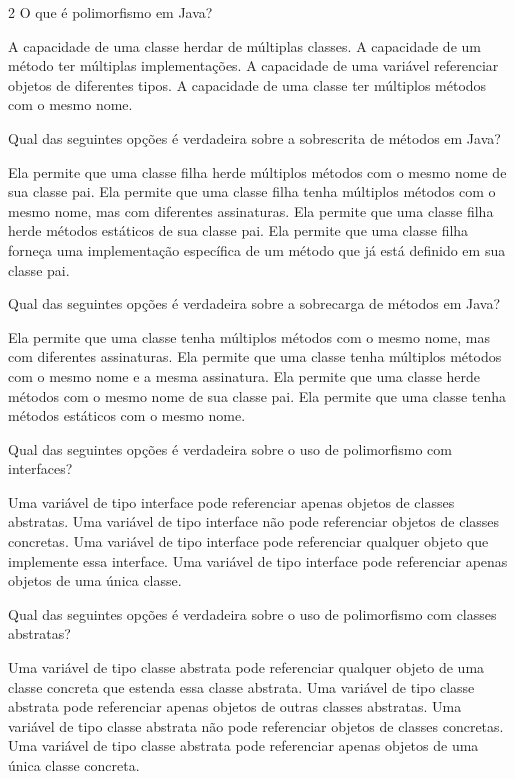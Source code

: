 \documentclass{exam}
\newcounter{solcount}
\newcommand\CC{%
    \CorrectChoice\label{sol:\arabic{solcount}}
    \stepcounter{solcount}
}
\begin{document}
\begin{questions}
\begin{multicols}{2}
\question[1] O que é polimorfismo em Java?
\begin{choices}
 \choice A capacidade de uma classe herdar de múltiplas classes.
 \choice A capacidade de um método ter múltiplas implementações.
 \CC A capacidade de uma variável referenciar objetos de diferentes tipos.
 \choice A capacidade de uma classe ter múltiplos métodos com o mesmo nome.
\end{choices}

\question[1] Qual das seguintes opções é verdadeira sobre a sobrescrita de métodos em Java?
\begin{choices}
 \choice Ela permite que uma classe filha herde múltiplos métodos com o mesmo nome de sua classe pai.
 \choice Ela permite que uma classe filha tenha múltiplos métodos com o mesmo nome, mas com diferentes assinaturas.
 \choice Ela permite que uma classe filha herde métodos estáticos de sua classe pai.
 \CC Ela permite que uma classe filha forneça uma implementação específica de um método que já está definido em sua classe pai.
\end{choices}

\question[1] Qual das seguintes opções é verdadeira sobre a sobrecarga de métodos em Java?
\begin{choices}
 \CC Ela permite que uma classe tenha múltiplos métodos com o mesmo nome, mas com diferentes assinaturas.
 \choice Ela permite que uma classe tenha múltiplos métodos com o mesmo nome e a mesma assinatura.
 \choice Ela permite que uma classe herde métodos com o mesmo nome de sua classe pai.
 \choice Ela permite que uma classe tenha métodos estáticos com o mesmo nome.
\end{choices}

\question[1] Qual das seguintes opções é verdadeira sobre o uso de polimorfismo com interfaces?
\begin{choices}
 \choice Uma variável de tipo interface pode referenciar apenas objetos de classes abstratas.
 \choice Uma variável de tipo interface não pode referenciar objetos de classes concretas.
 \CC Uma variável de tipo interface pode referenciar qualquer objeto que implemente essa interface.
 \choice Uma variável de tipo interface pode referenciar apenas objetos de uma única classe.
\end{choices}

\question[1] Qual das seguintes opções é verdadeira sobre o uso de polimorfismo com classes abstratas?
\begin{choices}
 \CC Uma variável de tipo classe abstrata pode referenciar qualquer objeto de uma classe concreta que estenda essa classe abstrata.
 \choice Uma variável de tipo classe abstrata pode referenciar apenas objetos de outras classes abstratas.
 \choice Uma variável de tipo classe abstrata não pode referenciar objetos de classes concretas.
 \choice Uma variável de tipo classe abstrata pode referenciar apenas objetos de uma única classe concreta.
\end{choices}


\end{multicols}
\end{questions}
\end{document}
